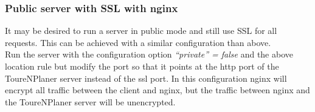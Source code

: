 \documentclass[ngerman,titlepage,parskip=true]{scrartcl}
\begin{document}
\subsubsection{Public server with SSL with nginx}

It may be desired to run a server in public mode and still use SSL for all requests. This can be achieved with a similar configuration than above.\\
Run the server with the configuration option \textit{``private'' = false} and the above location rule but modify the port so that it points at the http port of the ToureNPlaner server instead of the ssl port.
In this configuration nginx will encrypt all traffic between the client and nginx, but the traffic between nginx and the ToureNPlaner server will be unencrypted.
\end{document}
